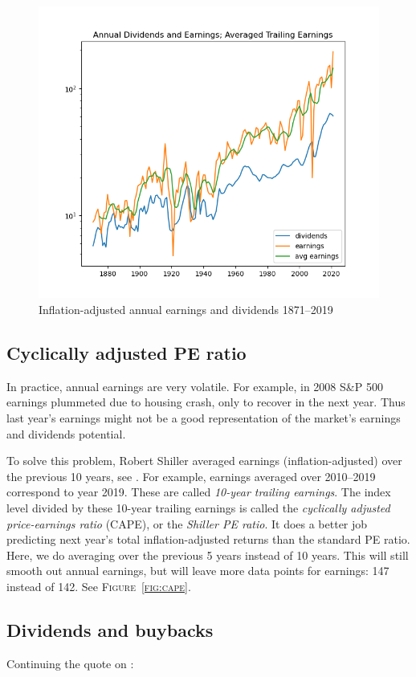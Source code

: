 \documentclass[12pt]{amsart}
\theoremstyle{definition}
\begin{document}
\begin{figure}[t]
\includegraphics[width = 12cm]{combined.png}
\caption{Inflation-adjusted annual earnings and dividends 1871--2019}
\label{fig:combined}
\end{figure}

\subsection{Cyclically adjusted PE ratio} In practice, annual earnings are very volatile. For example, in 2008 S\&P 500 earnings plummeted due to housing crash, only to recover in the next year. Thus last year's earnings might not be a good representation of the market's earnings and dividends potential. 

To solve this problem, Robert Shiller averaged earnings (inflation-adjusted) over the previous 10 years, see \cite{Shiller1998}. For example, earnings averaged over 2010--2019 correspond to year 2019. These are called {\it 10-year trailing earnings}. The index level divided by these 10-year trailing earnings is called the {\it cyclically adjusted price-earnings ratio} (CAPE), or the {\it Shiller PE ratio}. It does a better job predicting next year's total inflation-adjusted returns than the standard PE ratio. Here, we do averaging over the previous 5 years instead of 10 years. This will still smooth out annual earnings, but will leave more data points for earnings: 147 instead of 142. See \textsc{Figure~\ref{fig:cape}}.

\subsection{Dividends and buybacks} Continuing the quote on \cite[pp.325--326]{RW12}:
\end{document}
